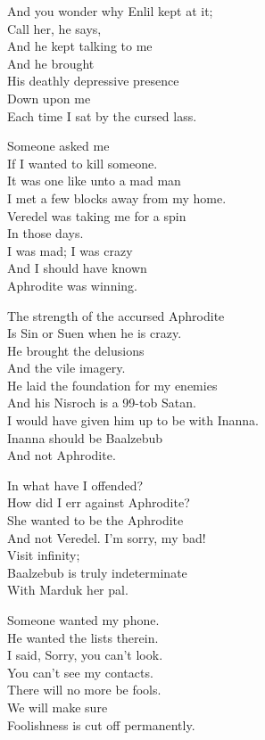\documentclass[
]{book}
\begin{document}
And you wonder why Enlil kept at it;\\
Call her, he says,\\
And he kept talking to me\\
And he brought\\
His deathly depressive presence\\
Down upon me\\
Each time I sat by the cursed lass.

Someone asked me\\
If I wanted to kill someone.\\
It was one like unto a mad man\\
I met a few blocks away from my home.\\
Veredel was taking me for a spin\\
In those days.\\
I was mad; I was crazy\\
And I should have known\\
Aphrodite was winning.

The strength of the accursed Aphrodite\\
Is Sin or Suen when he is crazy.\\
He brought the delusions\\
And the vile imagery.\\
He laid the foundation for my enemies\\
And his Nisroch is a 99-tob Satan.\\
I would have given him up to be with Inanna.\\
Inanna should be Baalzebub\\
And not Aphrodite.

In what have I offended?\\
How did I err against Aphrodite?\\
She wanted to be the Aphrodite\\
And not Veredel. I'm sorry, my bad!\\
Visit infinity;\\
Baalzebub is truly indeterminate\\
With Marduk her pal.

Someone wanted my phone.\\
He wanted the lists therein.\\
I said, Sorry, you can't look.\\
You can't see my contacts.\\
There will no more be fools.\\
We will make sure\\
Foolishness is cut off permanently.
\end{document}
